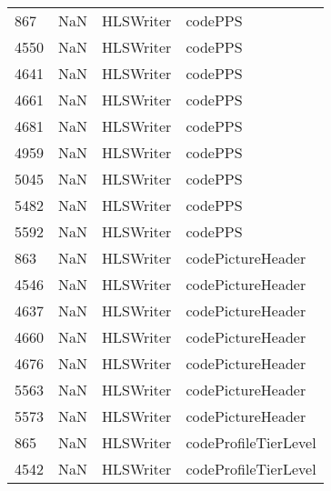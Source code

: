 \begin{tabular}{llll}
867  &                   NaN &                  HLSWriter &                                   codePPS \\
4550 &                   NaN &                  HLSWriter &                                   codePPS \\
4641 &                   NaN &                  HLSWriter &                                   codePPS \\
4661 &                   NaN &                  HLSWriter &                                   codePPS \\
4681 &                   NaN &                  HLSWriter &                                   codePPS \\
4959 &                   NaN &                  HLSWriter &                                   codePPS \\
5045 &                   NaN &                  HLSWriter &                                   codePPS \\
5482 &                   NaN &                  HLSWriter &                                   codePPS \\
5592 &                   NaN &                  HLSWriter &                                   codePPS \\
863  &                   NaN &                  HLSWriter &                         codePictureHeader \\
4546 &                   NaN &                  HLSWriter &                         codePictureHeader \\
4637 &                   NaN &                  HLSWriter &                         codePictureHeader \\
4660 &                   NaN &                  HLSWriter &                         codePictureHeader \\
4676 &                   NaN &                  HLSWriter &                         codePictureHeader \\
5563 &                   NaN &                  HLSWriter &                         codePictureHeader \\
5573 &                   NaN &                  HLSWriter &                         codePictureHeader \\
865  &                   NaN &                  HLSWriter &                      codeProfileTierLevel \\
4542 &                   NaN &                  HLSWriter &                      codeProfileTierLevel \\

\end{tabular}
